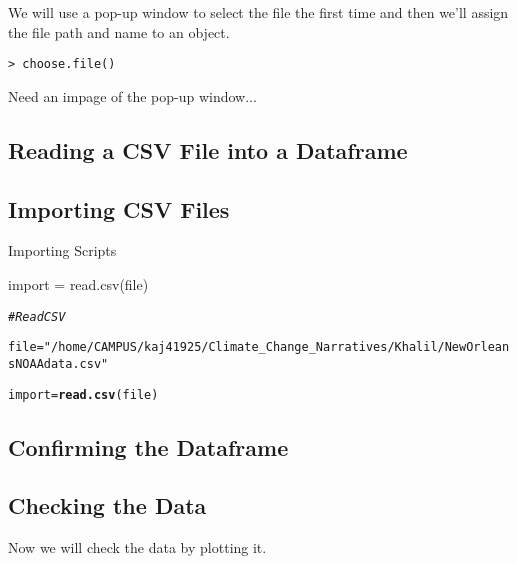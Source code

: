 \documentclass{article}\usepackage[]{graphicx}\usepackage[]{color}
\makeatletter
\newcommand{\hlstr}[1]{\textcolor[rgb]{0.192,0.494,0.8}{#1}}%
\newcommand{\hlcom}[1]{\textcolor[rgb]{0.678,0.584,0.686}{\textit{#1}}}%
\newcommand{\hlstd}[1]{\textcolor[rgb]{0.345,0.345,0.345}{#1}}%
\newcommand{\hlkwb}[1]{\textcolor[rgb]{0.69,0.353,0.396}{#1}}%
\newcommand{\hlkwd}[1]{\textcolor[rgb]{0.737,0.353,0.396}{\textbf{#1}}}%
\newenvironment{kframe}{%
 \def\at@end@of@kframe{}%
 \ifinner\ifhmode%
  \def\at@end@of@kframe{\end{minipage}}%
  \begin{minipage}{\columnwidth}%
 \fi\fi%
 \def\FrameCommand##1{\hskip\@totalleftmargin \hskip-\fboxsep
 \colorbox{shadecolor}{##1}\hskip-\fboxsep
     \hskip-\linewidth \hskip-\@totalleftmargin \hskip\columnwidth}%
 \MakeFramed {\advance\hsize-\width
   \@totalleftmargin\z@ \linewidth\hsize
   \@setminipage}}%
 {\par\unskip\endMakeFramed%
 \at@end@of@kframe}
\newenvironment{knitrout}{}{} %
\makeatother
\begin{document}
We will use a pop-up window to select the file the first time and then we'll assign the file path and name to an object. 

\begin{verbatim}
> choose.file()
\end{verbatim}

Need an impage of the pop-up window...

\subsection{Reading a CSV File into a Dataframe}


\subsection{Importing CSV Files}


Importing Scripts


import = read.csv(file)

\begin{knitrout}
\color{fgcolor}\begin{kframe}
\begin{alltt}
\hlcom{# Read CSV}

\hlstd{file} \hlkwb{=} \hlstr{"/home/CAMPUS/kaj41925/Climate_Change_Narratives/Khalil/NewOrleansNOAAdata.csv"}

\hlstd{import} \hlkwb{=} \hlkwd{read.csv}\hlstd{(file)}
\end{alltt}
\end{kframe}
\end{knitrout}

\subsection{Confirming the Dataframe}


\subsection{Checking the Data}

Now we will check the data by plotting it.

\end{document}
